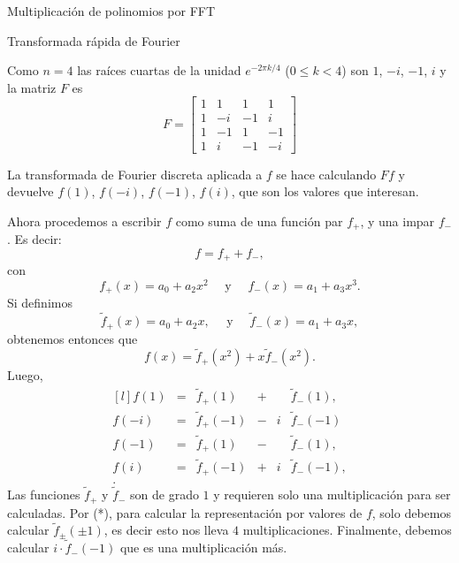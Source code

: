 \begin{chapter}{Multiplicación de polinomios por FFT}
\begin{section}{Transformada rápida de Fourier}
\begin{ejemplo*}
        Como $n=4$ las raíces cuartas de la unidad $e^{-2\pi k/4}$ ($0 \le k < 4$) son $1$, $-i$, $-1$, $i$ y la matriz $F$  es
        \begin{equation*}
            F=\begin{bmatrix}
                1 & 1  & 1  & 1  \\
                1 & -i & -1 & i  \\
                1 & -1 & 1  & -1 \\
                1 & i  & -1 & -i
            \end{bmatrix}
        \end{equation*}

        La transformada de Fourier discreta aplicada a $f$ se hace calculando $Ff$ y  devuelve  $f(1)$, $f(-i)$, $f(-1)$, $f(i)$,  que son los valores que interesan.

        Ahora procedemos a escribir  $f $ como suma de una función par $f_+$, y una impar $f_-$. Es decir:
        $$
            f = f_+ + f_-,$$
        con
        $$ f_+(x) = a_0 + a_2x^2 \quad  \text{ y } \quad f_-(x) = a_1 + a_3x^3.
        $$
        Si definimos
        $$
            \tilde{f}_+(x) = a_0 + a_2 x, \quad \text{ y } \quad \tilde{f}_-(x) = a_1 + a_3 x,
        $$
        obtenemos entonces que
        \begin{equation*}
            f(x) = \tilde{f}_+(x^2) + x \tilde{f}_-(x^2).
        \end{equation*}
        Luego,
        \begin{equation}
            \begin{matrix*}[l]
                f(1) &=& \tilde{f}_+(1)& + & &\tilde{f}_-(1), \\
                f(-i) &=& \tilde{f}_+(-1) &-&i & \tilde{f}_-(-1)\\
                f(-1) &=& \tilde{f}_+(1)& -&  &\tilde{f}_-(1), \\
                f(i) &=& \tilde{f}_+(-1)& +&  i&\tilde{f}_-(-1), \\.
            \end{matrix*} \tag{*}
        \end{equation}
        Las funciones $\tilde{f}_+$ y $\tilde{f}_-$ son de grado $1$ y requieren solo una multiplicación para ser calculadas. Por (*), para calcular la representación por valores de $f$, solo debemos calcular $\tilde{f}_\pm(\pm1)$,  es decir esto nos lleva $4$ multiplicaciones. Finalmente,  debemos  calcular $ i \cdot \tilde{f}_-(-1)$  que es una multiplicación más.


\end{ejemplo*}
\end{section}
\end{chapter}

